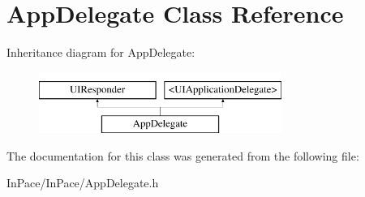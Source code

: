 \hypertarget{interfaceAppDelegate}{\section{App\-Delegate Class Reference}
\label{interfaceAppDelegate}
}
Inheritance diagram for App\-Delegate\-:\begin{figure}[H]
\begin{center}
\leavevmode
\includegraphics[height=2.000000cm]{interfaceAppDelegate}
\end{center}
\end{figure}


The documentation for this class was generated from the following file\-:\begin{DoxyCompactItemize}
\item 
In\-Pace/\-In\-Pace/App\-Delegate.\-h\end{DoxyCompactItemize}
